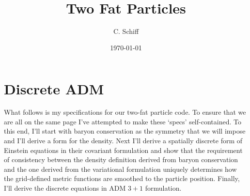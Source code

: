 %
% 
%
%
%                
%  

%
%

\def\.{{\quad .}}
\def\_.{{\quad .}}
\def\_,{{\quad ,}}

%
%

\draft



%
%
\title{Two Fat Particles}
%
\author{C. Schiff}
\address{
            Department of Physics, University of Maryland,
            College Park MD 20742-4111 USA\\
           \rm
         e-mail: \tt  cmschiff@erols.com\\
					  Revision 2.0
}
\date{\today}
\maketitle


%
%
\begin{abstract}
\end{abstract}


\section{Discrete ADM}

What follows is my specifications for our two-fat particle
code.  
To ensure that we are all on the same page I've attempted to
make these `specs' self-contained.  
To this end, I'll start with baryon conservation as the 
symmetry that we will impose and I'll derive a form for the 
density.
Next I'll derive a spatially discrete form of Einstein equations
in their covariant formulation and show that the requirement
of consistency between the density definition derived from 
baryon conservation and the one derived from the variational
formulation uniquely determines how the grid-defined metric
functions are smoothed to the particle position.
Finally, I'll derive the discrete equations in ADM $3+1$ formulation.  

